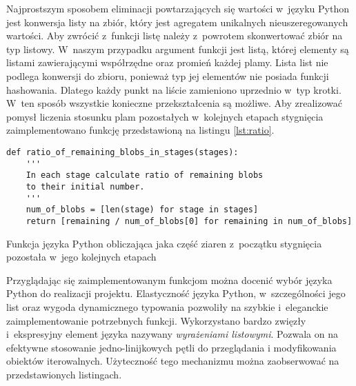 Najprostszym sposobem eliminacji powtarzających się wartości w~języku Python
jest konwersja listy na zbiór, który jest agregatem unikalnych nieuszeregowanych
wartości.
Aby zwrócić z~funkcji listę należy z~powrotem skonwertować zbiór na typ listowy.
W~naszym przypadku argument funkcji jest listą, której elementy są listami
zawierającymi współrzędne oraz promień każdej plamy.
Lista list nie podlega konwersji do zbioru, ponieważ typ jej elementów nie
posiada funkcji hashowania.
Dlatego każdy punkt na liście zamieniono uprzednio w~typ krotki.
W~ten sposób wszystkie konieczne przekształcenia są możliwe.
Aby zrealizować pomysł liczenia stosunku plam pozostałych w~kolejnych etapach
stygnięcia zaimplementowano funkcję przedstawioną na listingu \ref{lst:ratio}.
\begin{listing}[htb]
\begin{verbatim}
def ratio_of_remaining_blobs_in_stages(stages):
    '''
    In each stage calculate ratio of remaining blobs
    to their initial number.
    '''
    num_of_blobs = [len(stage) for stage in stages]
    return [remaining / num_of_blobs[0] for remaining in num_of_blobs]
\end{verbatim}
\caption{Funkcja języka Python obliczająca jaka część ziaren z~początku
    stygnięcia pozostała w~jego kolejnych etapach}
\label{lst:ratio}
\end{listing}

Przyglądając się zaimplementowanym funkcjom można docenić wybór języka
Python do realizacji projektu.
Elastyczność języka Python, w~szczególności jego list oraz wygoda dynamicznego
typowania pozwoliły na szybkie i~eleganckie zaimplementowanie potrzebnych
funkcji.
Wykorzystano bardzo zwięzły i~ekspresyjny element języka nazywany
\emph{wyrażeniami listowymi}.
Pozwala on na efektywne stosowanie jedno-linijkowych pętli do przeglądania
i modyfikowania obiektów iterowalnych.
Użyteczność tego mechanizmu można zaobserwować na przedstawionych listingach.

